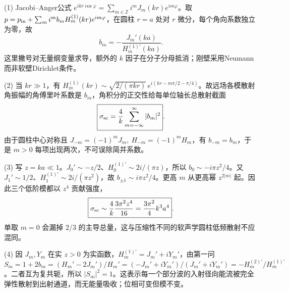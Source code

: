 (1) Jacobi–Anger公式 \(e^{ikr\cos\varphi}=\sum_{m\in\mathbb Z}i^mJ_m(kr)e^{im\varphi}\)。取
\(p=p_{\rm in}+\sum_m i^mb_mH_m^{(1)}(kr)e^{im\varphi}\)，在圆柱 \(r=a\) 处对 \(r\) 微分，每个角向系数独立为零，故
\[
\boxed{b_m=-\frac{J_m'(ka)}{H_m^{(1)\prime}(ka)}}.
\]
这里撇号对无量纲变量求导，额外的 \(k\) 因子在分子分母抵消；刚壁采用Neumann而非软壁Dirichlet条件。

(2) 当 \(kr\gg1\)，有 \(H_m^{(1)}(kr)\sim\sqrt{2/(\pi kr)}\,e^{i(kr-m\pi/2-\pi/4)}\)。故远场各模散射角振幅的角傅里叶系数是 \(b_m\)，角积分的正交性给每单位轴长总散射截面
\[
\boxed{\sigma_{\rm sc}=\frac4k\sum_{m=-\infty}^{\infty}|b_m|^2}.
\]
由于圆柱中心对称且 \(J_{-m}=(-1)^mJ_m,\ H_{-m}=(-1)^mH_m\)，有 \(b_{-m}=b_m\)，于是 \(m>0\) 每项出现两次，不可误除简并系数。

(3) 写 \(z=ka\ll1\)。\(J_0'\sim-z/2\)、\(H_0^{(1)\prime}\sim2i/(\pi z)\)，所以 \(b_0\sim-i\pi z^2/4\)。又 \(J_1'\sim1/2\)、\(H_1^{(1)\prime}\sim2i/(\pi z^2)\)，故 \(b_{\pm1}\sim i\pi z^2/4\)。更高 \(m\) 从更高幂 \(z^{2|m|}\) 起。因此三个低阶模都以 \(z^4\) 贡献强度，
\[
\boxed{\sigma_{\rm sc}\sim \frac4k\frac{3\pi^2z^4}{16}
=\frac{3\pi^2}{4}k^3a^4}.
\]
单取 \(m=0\) 会漏掉 \(2/3\) 的主导总量，这与压缩性不同的软声学圆柱低频散射不应混同。

(4) 因 \(J_m,Y_m\) 在实 \(z>0\) 为实函数，\(H_m^{(1)\prime}=J_m'+iY_m'\)，由第一问 \(S_m=1+2b_m=(H_m'-2J_m')/H_m'=(-J_m'+iY_m')/(J_m'+iY_m')=-H_m^{(2)\prime}/H_m^{(1)\prime}\)。二者互为复共轭，所以 \(\boxed{|S_m|^2=1}\)。这表示每一个部分波的入射径向能流被完全弹性散射到出射通道，而无能量吸收；位相可变但模不变。

